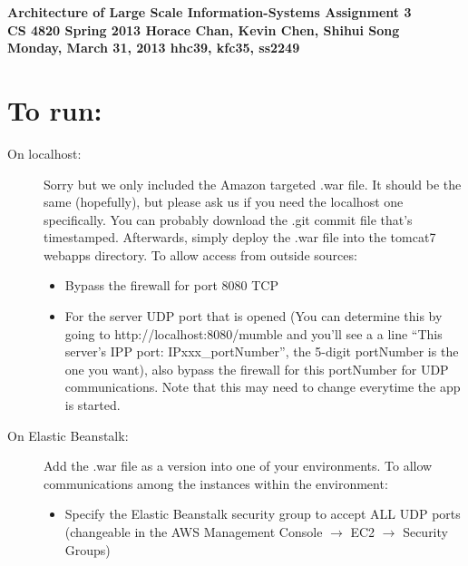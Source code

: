 \documentclass{article}
\begin{document}
\begin{framed}
  \large{\textbf{Architecture of Large Scale Information-Systems  \hfill Assignment 3\\
      CS 4820 Spring 2013 \hfill Horace Chan, Kevin Chen, Shihui Song \\
      Monday, March 31, 2013 \hfill hhc39, kfc35, ss2249
  }}
\end{framed}

\section{To run:}
  \begin{description}
    \item[On localhost:] Sorry but we only included the Amazon targeted .war file. It should be the same (hopefully), but please ask us if you need the localhost one specifically. You can probably download the .git commit file that's timestamped. Afterwards, simply deploy the .war file into the tomcat7 webapps directory. To allow access from outside sources:
      \begin{itemize}
        \item Bypass the firewall for port 8080 TCP
        \item For the server UDP port that is opened (You can determine this by going to http://localhost:8080/mumble and you'll see a a line ``This server's IPP port: IPxxx\_portNumber'', the 5-digit portNumber is the one you want), also bypass the firewall for this portNumber for UDP communications. Note that this may need to change everytime the app is started.
      \end{itemize}
    \item[On Elastic Beanstalk:] Add the .war file as a version into one of your environments. To allow communications among the instances within the environment:
      \begin{itemize}
        \item Specify the Elastic Beanstalk security group to accept ALL UDP ports (changeable in the AWS Management Console $\to$ EC2 $\to$ Security Groups)
      \end{itemize}
  \end{description}
\end{document}
